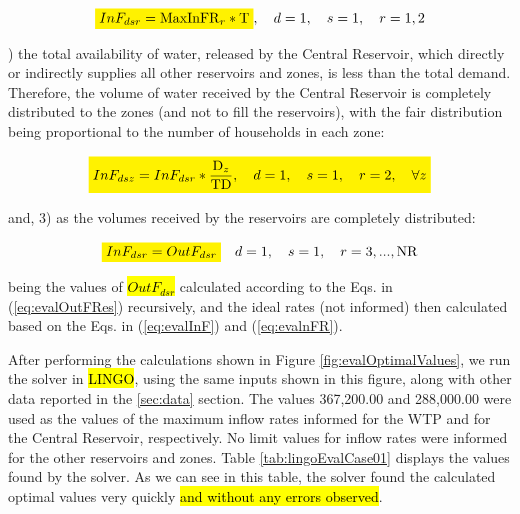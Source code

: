 \documentclass{singlecol}
\newcommand{\mathcolorbox}[2]{\colorbox{#1}{$\displaystyle #2$}}
\theoremstyle{TH}{
\newtheorem{lemma}{Lemma}
\newtheorem{theorem}[lemma]{Theorem}
\newtheorem{corrolary}[lemma]{Corrolary}
\newtheorem{conjecture}[lemma]{Conjecture}
\newtheorem{proposition}[lemma]{Proposition}
\newtheorem{claim}[lemma]{Claim}
\newtheorem{stheorem}[lemma]{Wrong Theorem}
\newtheorem{algorithm}{Algorithm}
}
\theoremstyle{THrm}{
\newtheorem{definition}{Definition}[section]
\newtheorem{question}{Question}[section]
\newtheorem{remark}{Remark}
\newtheorem{scheme}{Scheme}
}
\theoremstyle{THhit}{
\newtheorem{case}{Case}[section]
}
\begin{document}
\begin{equation}
	\mathcolorbox{yellow}{InF_{dsr} = \mathrm{MaxInFR}_r * \mathrm{T}}, \quad d = 1, \quad s = 1, \quad r = 1,2
	\label{eq:volInFRCentral}
\end{equation}

) the total availability of water, released by the Central Reservoir, which directly or indirectly supplies all other reservoirs and zones, is less than the total demand. Therefore, the volume of water received by the Central Reservoir is completely distributed to the zones (and not to fill the reservoirs), with the fair distribution being proportional to the number of households in each zone: 

\begin{equation}
	\mathcolorbox{yellow}{InF_{dsz} = InF_{dsr} * \dfrac{\mathrm{D}_z}{ \mathrm{TD}},
	\quad d = 1, \quad s = 1, \quad r = 2, \quad \forall z}  
\end{equation}

\noindent and, 3) as the volumes received by the reservoirs are completely distributed: 

\begin{equation}
	\mathcolorbox{yellow}{InF_{dsr} = OutF_{dsr}} \quad d = 1, \quad s = 1, \quad r=3, ..., \mathrm{NR}
\end{equation}

\noindent being the values of \hl{$OutF_{dsr}$} calculated according to the Eqs. in (\ref{eq:evalOutFRes}) recursively, and the ideal rates (not informed) then calculated based on the Eqs. in (\ref{eq:evalInF}) and (\ref{eq:evalnFR}).

After performing the calculations shown in Figure \ref{fig:evalOptimalValues}, we run the solver in \hl{LINGO}, using the same inputs shown in this figure, along with other data reported in the \ref{sec:data} section. The values 367,200.00 and 288,000.00 were used as the values of the maximum inflow rates informed for the WTP and for the Central Reservoir, respectively. No limit values for inflow rates were informed for the other reservoirs and zones. Table \ref{tab:lingoEvalCase01} displays the values found by the solver. As we can see in this table, the solver found the calculated optimal values very quickly \hl{and without any errors observed}. 
\end{document}
